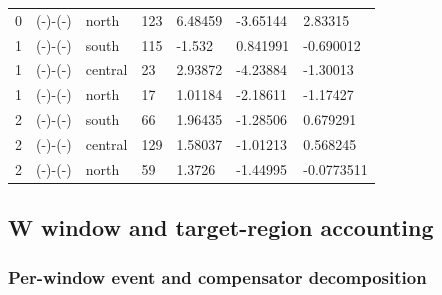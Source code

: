 \begin{longtable}
{}0 & (\allowbreak{}-\allowbreak{})-(\allowbreak{}-\allowbreak{}) & north & 123 & 6.48459 & -3.65144 & 2.83315 \\
{}1 & (\allowbreak{}-\allowbreak{})-(\allowbreak{}-\allowbreak{}) & south & 115 & -1.532 & 0.841991 & -0.690012 \\
{}1 & (\allowbreak{}-\allowbreak{})-(\allowbreak{}-\allowbreak{}) & central & 23 & 2.93872 & -4.23884 & -1.30013 \\
{}1 & (\allowbreak{}-\allowbreak{})-(\allowbreak{}-\allowbreak{}) & north & 17 & 1.01184 & -2.18611 & -1.17427 \\
{}2 & (\allowbreak{}-\allowbreak{})-(\allowbreak{}-\allowbreak{}) & south & 66 & 1.96435 & -1.28506 & 0.679291 \\
{}2 & (\allowbreak{}-\allowbreak{})-(\allowbreak{}-\allowbreak{}) & central & 129 & 1.58037 & -1.01213 & 0.568245 \\
{}2 & (\allowbreak{}-\allowbreak{})-(\allowbreak{}-\allowbreak{}) & north & 59 & 1.3726 & -1.44995 & -0.0773511 \\
\end{longtable}\endgroup


\subsection{W window and target-region accounting}
\label{app:audit10-w}

\subsubsection{Per-window event and compensator decomposition}

